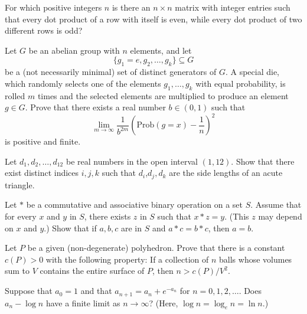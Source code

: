 \documentclass[12pt]{article}
\begin{document}
    \begin{exercise}[2011 A4]
        For which positive integers $n$ is there an $n \times n$ matrix with integer entries such that every dot product of a row with itself is even, while every dot product of two different rows is odd?
    \end{exercise}

    \begin{exercise}[2011 A6]
        Let \(G\) be an abelian group with \(n\) elements, and let
        \[\{g_1=e,g_2,\ldots,g_k\}\subseteq G\]
        be a (not necessarily minimal) set of distinct generators of \(G\).
        A special die, which randomly selects one of the elements \(g_1,\ldots,g_k\) with equal probability, is rolled \(m\) times and the selected elements are multiplied to produce an element \(g\in G\).
        Prove that there exists a real number \(b\in(0,1)\) such that
        \[\lim_{m\to\infty}\frac{1}{b^{2m}}\left(\textrm{Prob}(g=x)-\frac{1}{n}\right)^2\]
        is positive and finite.
    \end{exercise}

    \begin{exercise}[2012 A1]
        Let $d_{1}, d_{2}, \ldots, d_{12}$ be real numbers in the open interval $(1, 12)$. Show that there exist distinct indices $i, j, k$ such that $d_{i}$,$d_{j},d_{k}$ are the side lengths of an acute triangle.
    \end{exercise}

    \begin{exercise}[2012 A2]
        Let $*$ be a commutative and associative binary operation on a set $S$. Assume that for every $x$ and $y$ in $S$, there exists $z$ in $S$ such that $x*z=y$. (This $z$ may depend on $x$ and $y$.) Show that if $a,b,c$ are in $S$ and $a*c=b*c$, then $a = b$.
    \end{exercise}

    \begin{exercise}[2012 B2]
        Let $P$ be a given (non-degenerate) polyhedron. Prove that there is a constant $c(P ) > 0$ with the following property: If a collection of $n$ balls whose volumes sum to $V$ contains the entire surface of $P$, then $n > c(P)/V^2$.
    \end{exercise}

    \begin{exercise}[2012 B4]
        Suppose that \(a_0=1\) and that \(a_{n+1}=a_n+e^{-a_n}\) for \(n=0,1,2,\ldots\). Does \(a_n-\log n\) have a finite limit as \(n\to\infty\)? (Here, \(\log n=\log_en=\ln n\).)
    \end{exercise}
\end{document}
